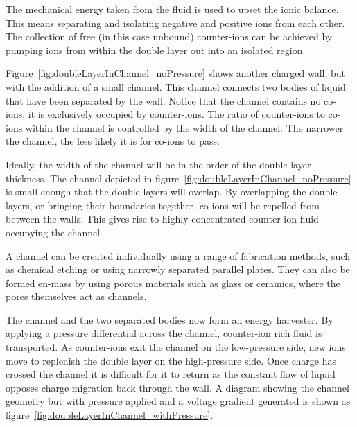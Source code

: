     The mechanical energy taken from the fluid is used to upset the ionic balance.
    This means separating and isolating negative and positive ions from each other.
    The collection of free (in this case unbound) counter-ions can be achieved by pumping ions from within the double layer out into an isolated region.

    Figure~\ref{fig:doubleLayerInChannel_noPressure} shows another charged wall, but with the addition of a small channel.
    This channel connects two bodies of liquid that have been separated by the wall.
    Notice that the channel contains no co-ions, it is exclusively occupied by counter-ions.
    The ratio of counter-ions to co-ions within the channel is controlled by the width of the channel.
    The narrower the channel, the less likely it is for co-ions to pass.

    Ideally, the width of the channel will be in the order of the double layer thickness.
    The channel depicted in figure~\ref{fig:doubleLayerInChannel_noPressure} is small enough that the double layers will overlap.
    By overlapping the double layers, or bringing their boundaries together, co-ions will be repelled from between the walls.
    This gives rise to highly concentrated counter-ion fluid occupying the channel.

    A channel can be created individually using a range of fabrication methods, such as chemical etching or using narrowly separated parallel plates.
    They can also be formed en-mass by using porous materials such as glass or ceramics, where the pores themselves act as channels.

    The channel and the two separated bodies now form an energy harvester.
    By applying a pressure differential across the channel, counter-ion rich fluid is transported.
    As counter-ions exit the channel on the low-pressure side, new ions move to replenish the double layer on the high-pressure side.
    Once charge has crossed the channel it is difficult for it to return as the constant flow of liquid opposes charge migration back through the wall.
    A diagram showing the channel geometry but with pressure applied and a voltage gradient generated is shown as figure~\ref{fig:doubleLayerInChannel_withPressure}.

